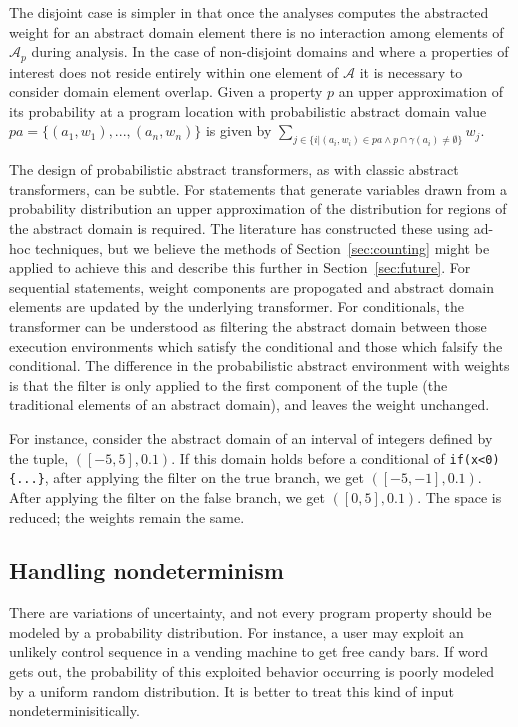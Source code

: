 The disjoint case is simpler in that once the analyses computes
the abstracted weight for an abstract domain element there is
no interaction among elements of $\mathcal{A}_p$ during analysis.
In the case of non-disjoint domains and where a properties of interest
does not reside entirely within one element of $\mathcal{A}$ it is
necessary to consider domain element overlap. 
Given a property $p$ an upper approximation of its probability 
at a program location with probabilistic abstract domain
value $pa = \{(a_1,w_1), ..., (a_n,w_n)\}$
is given by $\sum_{j \in \{ i \vert (a_i,w_i) \in pa \wedge   
p \cap \gamma(a_i) \not= \emptyset\}} w_j$.

The design of probabilistic abstract transformers, as with 
classic abstract transformers, can be subtle.
For statements that generate variables drawn from a probability
distribution an upper approximation of the distribution for
regions of the abstract domain is required.  The literature
has constructed these using ad-hoc techniques, but we believe
the methods of Section~\ref{sec:counting} might be applied to 
achieve this and describe this further in Section~\ref{sec:future}.
For sequential statements, weight components are propogated
and abstract domain elements are updated by the underlying transformer.
For conditionals, the transformer can be understood
as filtering the abstract domain between those execution environments which
satisfy the conditional and those which falsify the conditional. 
The difference in the probabilistic abstract environment with weights 
is that the filter is only applied to the first component of
the tuple (the traditional elements of an abstract domain), 
and leaves the weight unchanged.

For instance, consider the abstract domain of an interval of 
integers defined by the tuple, $([-5,5],0.1)$. 
If this domain holds before a conditional of 
{\tt if(x<0)\{...\}}, after applying the filter on the true branch, 
we get $([-5,-1],0.1)$. 
After applying the filter on the false branch, we get $([0,5],0.1)$.
The space is reduced; the weights remain the same.

\subsection{Handling nondeterminism}

There are variations of uncertainty,
and not every program property should be modeled by a
probability distribution.
For instance, a user may exploit an unlikely control sequence
in a vending machine to get free candy bars. 
If word gets out, the probability of
this exploited behavior occurring is poorly modeled by a uniform 
random distribution.
It is better to treat this kind of input nondeterminisitically.

